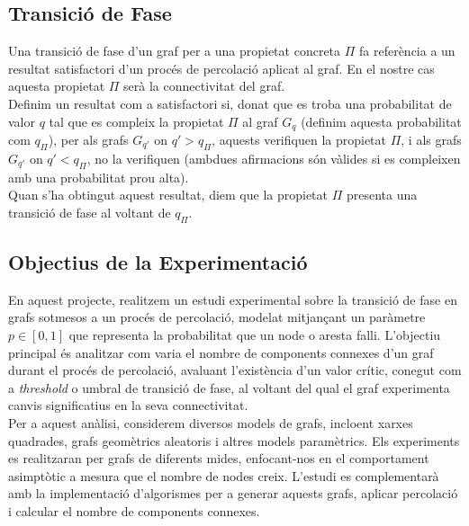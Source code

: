 \documentclass[a4paper]{article}
\begin{document}
	\subsection{Transició de Fase}
	
	Una transició de fase d'un graf per a una propietat concreta $\Pi$ fa referència a un resultat satisfactori d'un procés de percolació aplicat al graf. En el nostre cas aquesta propietat $\Pi$ serà la connectivitat del graf. \\
	
	Definim un resultat com a satisfactori si, donat que es troba una probabilitat de valor $q$ tal que es compleix la propietat $\Pi$ al graf $G_q$ (definim aquesta probabilitat com $q_{\Pi}$), per als grafs $G_{q'}$ on $q' > q_{\Pi}$, aquests verifiquen la propietat $\Pi$, i als grafs $G_{q'}$ on $q' < q_{\Pi}$, no la verifiquen (ambdues afirmacions són vàlides si es compleixen amb una probabilitat prou alta). \\
	
	Quan s'ha obtingut aquest resultat, diem que la propietat $\Pi$ presenta una transició de fase al voltant de $q_{\Pi}$. \\
	
	\subsection{Objectius de la Experimentació}
	
	En aquest projecte, realitzem un estudi experimental sobre la transició de fase en grafs sotmesos a un procés de percolació, modelat mitjançant un paràmetre \( p \in [0, 1] \) que representa la probabilitat que un node o aresta falli. L'objectiu principal és analitzar com varia el nombre de components connexes d'un graf durant el procés de percolació, avaluant l'existència d'un valor crític, conegut com a \textit{threshold} o umbral de transició de fase, al voltant del qual el graf experimenta canvis significatius en la seva connectivitat. \\
	
	Per a aquest anàlisi, considerem diversos models de grafs, incloent xarxes quadrades, grafs geomètrics aleatoris i altres models paramètrics. Els experiments es realitzaran per grafs de diferents mides, enfocant-nos en el comportament asimptòtic a mesura que el nombre de nodes creix. L'estudi es complementarà amb la implementació d'algorismes per a generar aquests grafs, aplicar percolació i calcular el nombre de components connexes. \\
	
\end{document}
